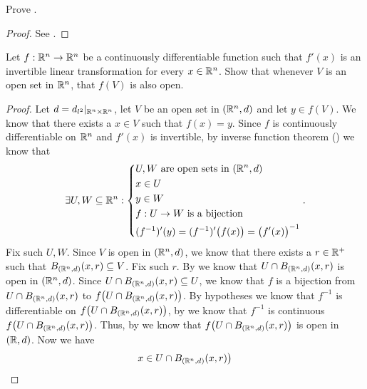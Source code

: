 \begin{ex}\label{ii:ex:6.7.2}
  Prove .
\end{ex}

\begin{proof}
  See .
\end{proof}

\begin{ex}\label{ii:ex:6.7.3}
  Let \(f : \mathbb{R}^n \to \mathbb{R}^n\) be a continuously differentiable function such that \(f'(x)\) is an invertible linear transformation for every \(x \in \mathbb{R}^n\).
  Show that whenever \(V\) is an open set in \(\mathbb{R}^n\), that \(f(V)\) is also open.
\end{ex}

\begin{proof}
  Let \(d = d_{l^2}|_{\mathbb{R}^n \times \mathbb{R}^n}\), let \(V\) be an open set in \((\mathbb{R}^n, d)\) and let \(y \in f(V)\).
  We know that there exists a \(x \in V\) such that \(f(x) = y\).
  Since \(f\) is continuously differentiable on \(\mathbb{R}^n\) and \(f'(x)\) is invertible, by inverse function theorem () we know that
  \[
    \exists U, W \subseteq \mathbb{R}^n : \begin{dcases}
      U, W \text{ are open sets in } (\mathbb{R}^n, d) \\
      x \in U                                  \\
      y \in W                                  \\
      f : U \to W \text{ is a bijection}       \\
      (f^{-1})'(y) = (f^{-1})'\big(f(x)\big) = \big(f'(x)\big)^{-1}
    \end{dcases}.
  \]
  Fix such \(U, W\).
  Since \(V\) is open in \((\mathbb{R}^n, d)\), we know that there exists a \(r \in \mathbb{R}^+\) such that \(B_{(\mathbb{R}^n, d)}(x, r) \subseteq V\).
  Fix such \(r\).
  By  we know that \(U \cap B_{(\mathbb{R}^n, d)}(x, r)\) is open in \((\mathbb{R}^n, d)\).
  Since \(U \cap B_{(\mathbb{R}^n, d)}(x, r) \subseteq U\), we know that \(f\) is a bijection from \(U \cap B_{(\mathbb{R}^n, d)}(x, r)\) to \(f\big(U \cap B_{(\mathbb{R}^n, d)}(x, r)\big)\).
  By hypotheses we know that \(f^{-1}\) is differentiable on \(f\big(U \cap B_{(\mathbb{R}^n, d)}(x, r)\big)\), by  we know that \(f^{-1}\) is continuous \(f\big(U \cap B_{(\mathbb{R}^n, d)}(x, r)\big)\).
  Thus, by  we know that \(f\big(U \cap B_{(\mathbb{R}^n, d)}(x, r)\big)\) is open in \((\mathbb{R}, d)\).
  Now we have
  \begin{align*}
             & x \in U \cap B_{(\R^n, d)}(x, r)\big)                                                                                                                    \\

\end{align*}
\end{proof}
